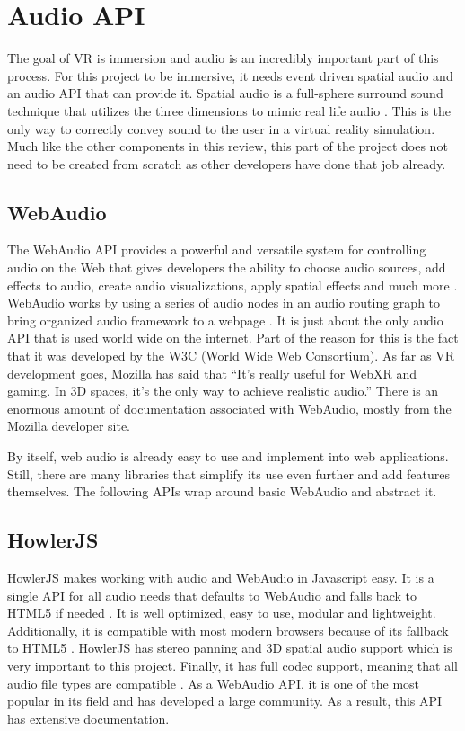 \section{Audio API}
The goal of VR is immersion and audio is an incredibly important part of this process. For this project to be immersive, it needs event driven spatial audio and an audio API that can provide it. Spatial audio is a full-sphere surround sound technique that utilizes the three dimensions to mimic real life audio \cite{r12}. This is the only way to correctly convey sound to the user in a virtual reality simulation. Much like the other components in this review, this part of the project does not need to be created from scratch as other developers have done that job already.

\subsection{WebAudio}
The WebAudio API provides a powerful and versatile system for controlling audio on the Web that gives developers the ability to choose audio sources, add effects to audio, create audio visualizations, apply spatial effects and much more \cite{r13}. WebAudio works by using a series of audio nodes in an audio routing graph to bring organized audio framework to a webpage \cite{r13}. It is just about the only audio API that is used world wide on the internet. Part of the reason for this is the fact that it was developed by the W3C (World Wide Web Consortium). As far as VR development goes, Mozilla has said that “It's really useful for WebXR and gaming. In 3D spaces, it's the only way to achieve realistic audio.” \cite{r14} There is an enormous amount of documentation associated with WebAudio, mostly from the Mozilla developer site.

By itself, web audio is already easy to use and implement into web applications. Still, there are many libraries that simplify its use even further and add features themselves. The following APIs wrap around basic WebAudio and abstract it.

\subsection{HowlerJS}
HowlerJS makes working with audio and WebAudio in Javascript easy. It is a single API for all audio needs that defaults to WebAudio and falls back to HTML5 if needed \cite{r15}. It is well optimized, easy to use, modular and lightweight. Additionally, it is compatible with most modern browsers because of its fallback to HTML5 \cite{r15}. HowlerJS has stereo panning and 3D spatial audio support which is very important to this project. Finally, it has full codec support, meaning that all audio file types are compatible \cite{r15}. As a WebAudio API, it is one of the most popular in its field and has developed a large community. As a result, this API has extensive documentation.

